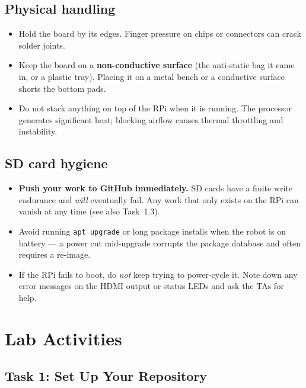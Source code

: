 \documentclass{ol-softwaremanual}
\begin{document}
\subsection*{Physical handling}

\begin{itemize}
  \item Hold the board by its edges.
        Finger pressure on chips or connectors can crack solder joints.
  \item Keep the board on a \textbf{non-conductive surface} (the anti-static bag it came
        in, or a plastic tray).
        Placing it on a metal bench or a conductive surface shorts the bottom
        pads.
  \item Do not stack anything on top of the RPi when it is running.
        The processor generates significant heat; blocking airflow causes thermal
        throttling and instability.
\end{itemize}

\subsection*{SD card hygiene}

\begin{itemize}
  \item \textbf{Push your work to GitHub immediately.}
        SD cards have a finite write endurance and \emph{will} eventually fail.
        Any work that only exists on the RPi can vanish at any time (see also
        Task~1.3).
  \item Avoid running \texttt{apt upgrade} or long package installs when the
        robot is on battery --- a power cut mid-upgrade corrupts the package
        database and often requires a re-image.
  \item If the RPi fails to boot, do \emph{not} keep trying to power-cycle it.
        Note down any error messages on the HDMI output or status LEDs and ask
        the TAs for help.
\end{itemize}


\section{Lab Activities}

\subsection{Task 1: Set Up Your Repository}\label{sec:task1}
\end{document}
